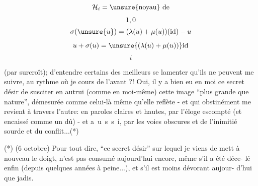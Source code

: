 \[
\mathcal H_i=\text{\unsure{noyau} de}
\]
\[
1,0
\]
\[
\sigma(\unsure{u})=(\lambda(u)+\mu(u))(\mathrm{id})-u
\]
\[
u+\sigma(u)=\unsure{(\lambda(u)+\mu(u))}\mathrm{id}
\]
\[
i
\]

(par surcroît); d'entendre certains des meilleurs se lamenter qu'ils ne peuvent
me suivre, au rythme où je cours de l'avant ?! Oui, il y a bien eu en moi ce
secret désir de susciter en autrui (comme en moi-même) cette image ``plus grande
que nature'', démesurée comme celui-là même qu'elle reflète - et qui obstinément
me revient à travers l'autre: en paroles claires et hautes, par l'éloge escompté
(et encaissé comme un dû) - et \mbox{a u s s i}, par les voies obscures et 
de l'inimitié sourde et du conflit...(*)

(*) (6 octobre) Pour tout dire, ``ce secret désir'' sur lequel je viens de mett
à nouveau le doigt, n'est pas consumé aujourd'hui encore, même s'il a été déce-\linebreak
lé enfin (depuis quelques années à peine...), et s'il est moins dévorant aujour-\linebreak
d'hui que jadis.


